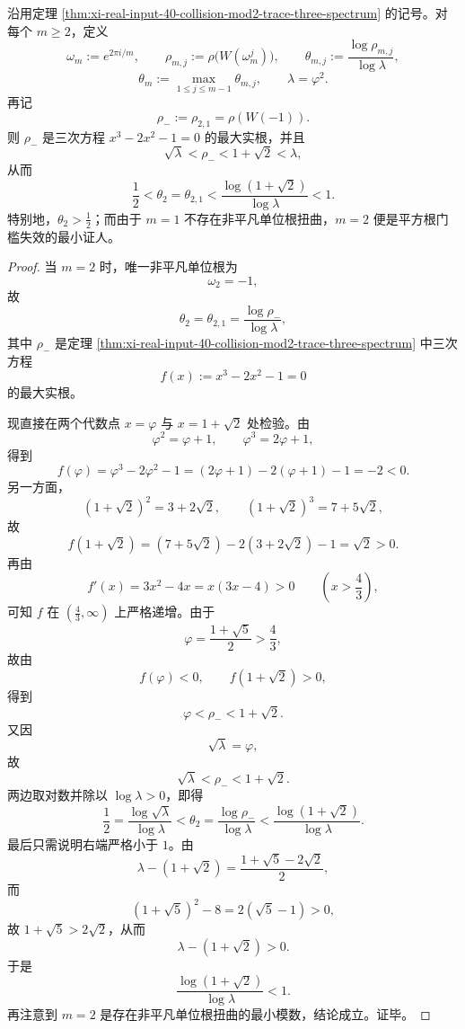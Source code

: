 \begin{theorem}\label{thm:xi-real-input-40-collision-minimal-modulus-two-witness}
沿用定理 \ref{thm:xi-real-input-40-collision-mod2-trace-three-spectrum} 的记号。对每个 \(m\ge 2\)，定义
\[
\omega_m:=e^{2\pi i/m},
\qquad
\rho_{m,j}:=\rho\!\bigl(W(\omega_m^j)\bigr),
\qquad
\theta_{m,j}:=\frac{\log \rho_{m,j}}{\log\lambda},
\]
\[
\theta_m:=\max_{1\le j\le m-1}\theta_{m,j},
\qquad
\lambda=\varphi^2.
\]
再记
\[
\rho_-:=\rho_{2,1}=\rho(W(-1)).
\]
则 \(\rho_-\) 是三次方程 \(x^3-2x^2-1=0\) 的最大实根，并且
\[
\sqrt{\lambda}<\rho_-<1+\sqrt2<\lambda,
\]
从而
\[
\boxed{\;
\frac12
<
\theta_2=\theta_{2,1}
<
\frac{\log(1+\sqrt2)}{\log\lambda}
<
1.\;}
\]
特别地，\(\theta_2>\frac12\)；而由于 \(m=1\) 不存在非平凡单位根扭曲，\(m=2\) 便是平方根门槛失效的最小证人。
\end{theorem}
\begin{proof}
当 \(m=2\) 时，唯一非平凡单位根为
\[
\omega_2=-1,
\]
故
\[
\theta_2=\theta_{2,1}=\frac{\log\rho_-}{\log\lambda},
\]
其中 \(\rho_-\) 是定理 \ref{thm:xi-real-input-40-collision-mod2-trace-three-spectrum} 中三次方程
\[
f(x):=x^3-2x^2-1=0
\]
的最大实根。

现直接在两个代数点 \(x=\varphi\) 与 \(x=1+\sqrt2\) 处检验。由
\[
\varphi^2=\varphi+1,
\qquad
\varphi^3=2\varphi+1,
\]
得到
\[
f(\varphi)
=
\varphi^3-2\varphi^2-1
=
(2\varphi+1)-2(\varphi+1)-1
=
-2<0.
\]
另一方面，
\[
(1+\sqrt2)^2=3+2\sqrt2,
\qquad
(1+\sqrt2)^3=7+5\sqrt2,
\]
故
\[
f(1+\sqrt2)
=(7+5\sqrt2)-2(3+2\sqrt2)-1
=\sqrt2>0.
\]
再由
\[
f'(x)=3x^2-4x=x(3x-4)>0
\qquad \left(x>\frac43\right),
\]
可知 \(f\) 在 \((\frac43,\infty)\) 上严格递增。由于
\[
\varphi=\frac{1+\sqrt5}{2}>\frac43,
\]
故由
\[
f(\varphi)<0,
\qquad
f(1+\sqrt2)>0,
\]
得到
\[
\varphi<\rho_-<1+\sqrt2.
\]
又因
\[
\sqrt{\lambda}=\varphi,
\]
故
\[
\sqrt{\lambda}<\rho_-<1+\sqrt2.
\]
两边取对数并除以 \(\log\lambda>0\)，即得
\[
 \frac12
 =
 \frac{\log\sqrt{\lambda}}{\log\lambda}
 <
 \theta_2
 =
 \frac{\log\rho_-}{\log\lambda}
<
\frac{\log(1+\sqrt2)}{\log\lambda}.
\]
最后只需说明右端严格小于 \(1\)。由
\[
\lambda-(1+\sqrt2)=\frac{1+\sqrt5-2\sqrt2}{2},
\]
而
\[
(1+\sqrt5)^2-8=2(\sqrt5-1)>0,
\]
故 \(1+\sqrt5>2\sqrt2\)，从而
\[
\lambda-(1+\sqrt2)>0.
\]
于是
\[
\frac{\log(1+\sqrt2)}{\log\lambda}<1.
\]
再注意到 \(m=2\) 是存在非平凡单位根扭曲的最小模数，结论成立。证毕。
\end{proof}

